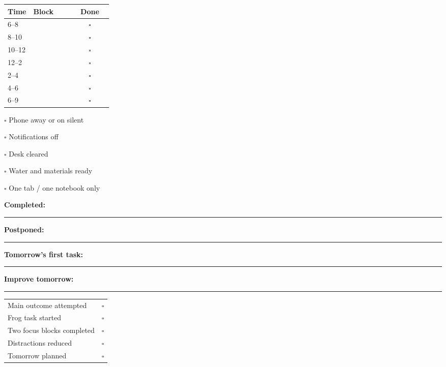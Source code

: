 \documentclass[10pt,a4paper]{article}
\begin{document}
{\begin{minipage}[t]{0.32\linewidth}
\begin{tcolorbox}[usebox,title={4. Time blocking}]
\begin{tabularx}{\linewidth}{p{0.24\linewidth}X c}
\textbf{Time} & \textbf{Block} & \textbf{Done}\\\hline
6--8 & & $\square$\\
8--10 & & $\square$\\
10--12 & & $\square$\\
12--2 & & $\square$\\
2--4 & & $\square$\\
4--6 & & $\square$\\
6--9 & & $\square$\\
\end{tabularx}
\end{tcolorbox}
\end{minipage}\hfill
\begin{minipage}[t]{0.32\linewidth}
\begin{tcolorbox}[usebox,title={5. Distraction control}]
$\square$ Phone away or on silent\par
$\square$ Notifications off\par
$\square$ Desk cleared\par
$\square$ Water and materials ready\par
$\square$ One tab / one notebook only
\end{tcolorbox}

\begin{tcolorbox}[usebox,title={6. End-of-day review}]
\textbf{Completed:}\par\rule{0.96\linewidth}{0.35pt}\par\vspace{2mm}
\textbf{Postponed:}\par\rule{0.96\linewidth}{0.35pt}\par\vspace{2mm}
\textbf{Tomorrow's first task:}\par\rule{0.96\linewidth}{0.35pt}\par\vspace{2mm}
\textbf{Improve tomorrow:}\par\rule{0.96\linewidth}{0.35pt}
\end{tcolorbox}

\begin{tcolorbox}[usebox,title={7. Daily score}]
\begin{tabularx}{\linewidth}{X c}
Main outcome attempted & $\square$\\
Frog task started & $\square$\\
Two focus blocks completed & $\square$\\
Distractions reduced & $\square$\\
Tomorrow planned & $\square$\\
\end{tabularx}
\end{tcolorbox}
\end{minipage}
}
\end{document}
